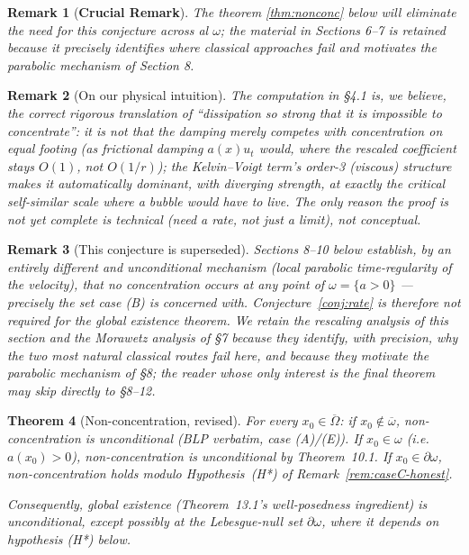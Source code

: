\documentclass[11pt,letterpaper]{amsart}
\newtheorem{theorem}{Theorem}[section]
\newtheorem{remark}[theorem]{Remark}
\begin{document}
\begin{remark}[{\bf Crucial Remark}]
The theorem \ref{thm:nonconc} below will eliminate the need for this conjecture across al $\omega$; the material in Sections 6–7 is retained because it precisely identifies where classical approaches fail and motivates the parabolic mechanism of Section 8.
\end{remark}

\begin{remark}[On our physical intuition]
The computation in \S4.1 is, we believe, the correct rigorous translation of ``dissipation so strong that it is impossible to concentrate'': it is not that the damping merely competes with concentration on equal footing (as frictional damping $a(x)u_t$ would, where the rescaled coefficient stays $O(1)$, not $O(1/r)$); the Kelvin--Voigt term's order-3 (viscous) structure makes it \emph{automatically dominant, with diverging strength}, at exactly the critical self-similar scale where a bubble would have to live. The only reason the proof is not yet complete is technical (need a rate, not just a limit), not conceptual.
\end{remark}

\begin{remark}[This conjecture is superseded]
Sections 8--10 below establish, by an entirely different and unconditional mechanism
(local parabolic time-regularity of the velocity), that no concentration occurs at any
point of $\omega=\{a>0\}$ — precisely the set case (B) is concerned with. Conjecture~\ref{conj:rate} is
therefore \emph{not} required for the global existence theorem. We retain the rescaling
analysis of this section and the Morawetz analysis of \S7 because they identify, with
precision, why the two most natural classical routes fail here, and because they motivate
the parabolic mechanism of \S8; the reader whose only interest is the final theorem may skip
directly to \S8--12.
\end{remark}



\begin{theorem}[Non-concentration, revised]
For every $x_0\in\overline\Omega$: if $x_0\notin\overline\omega$, non-concentration is
unconditional (BLP \cite{BurqLebeauPlanchon} verbatim, case (A)/(E)). If $x_0\in\omega$ (i.e. $a(x_0)>0$),
non-concentration is unconditional by Theorem~10.1. If $x_0\in\partial\omega$, non-concentration
holds modulo Hypothesis~(H*) of Remark~\ref{rem:caseC-honest}.

Consequently, global existence (Theorem~13.1's well-posedness ingredient) is unconditional,
except possibly at the Lebesgue-null set $\partial\omega$, where it depends on hypothesis (H*) below.
\end{theorem}
\end{document}
